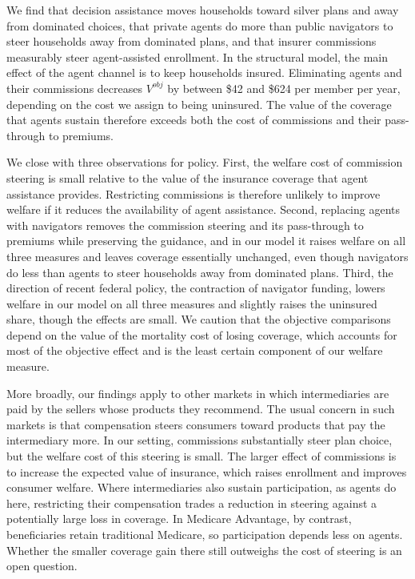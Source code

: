 \documentclass[12pt]{article}
\begin{document}
We find that decision assistance moves households toward silver plans and away from dominated choices, that private agents do more than public navigators to steer households away from dominated plans, and that insurer commissions measurably steer agent-assisted enrollment. In the structural model, the main effect of the agent channel is to keep households insured. Eliminating agents and their commissions decreases $V^{obj}$ by between \$42 and \$624 per member per year, depending on the cost we assign to being uninsured. The value of the coverage that agents sustain therefore exceeds both the cost of commissions and their pass-through to premiums.

We close with three observations for policy. First, the welfare cost of commission steering is small relative to the value of the insurance coverage that agent assistance provides. Restricting commissions is therefore unlikely to improve welfare if it reduces the availability of agent assistance. Second, replacing agents with navigators removes the commission steering and its pass-through to premiums while preserving the guidance, and in our model it raises welfare on all three measures and leaves coverage essentially unchanged, even though navigators do less than agents to steer households away from dominated plans. Third, the direction of recent federal policy, the contraction of navigator funding, lowers welfare in our model on all three measures and slightly raises the uninsured share, though the effects are small. We caution that the objective comparisons depend on the value of the mortality cost of losing coverage, which accounts for most of the objective effect and is the least certain component of our welfare measure.

More broadly, our findings apply to other markets in which intermediaries are paid by the sellers whose products they recommend. The usual concern in such markets is that compensation steers consumers toward products that pay the intermediary more. In our setting, commissions substantially steer plan choice, but the welfare cost of this steering is small. The larger effect of commissions is to increase the expected value of insurance, which raises enrollment and improves consumer welfare. Where intermediaries also sustain participation, as agents do here, restricting their compensation trades a reduction in steering against a potentially large loss in coverage. In Medicare Advantage, by contrast, beneficiaries retain traditional Medicare, so participation depends less on agents. Whether the smaller coverage gain there still outweighs the cost of steering is an open question.
\end{document}
